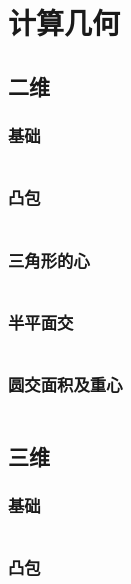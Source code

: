 \chapter{计算几何}

\section{二维}
\subsection{基础}
\inputminted{cpp}{\source/computational-geometry/2d/basis.cpp}
\subsection{凸包}
\inputminted{cpp}{\source/computational-geometry/2d/convex.cpp}
\subsection{三角形的心}
\inputminted{cpp}{\source/computational-geometry/2d/triangle.cpp}
\subsection{半平面交}
\inputminted{cpp}{\source/computational-geometry/2d/half-plane-intersection.cpp}
\subsection{圆交面积及重心}
\inputminted{cpp}{\source/computational-geometry/2d/circles-intersections.cpp}

\section{三维}
\subsection{基础}
\inputminted{cpp}{\source/computational-geometry/3d/basis.cpp}
\subsection{凸包}
\inputminted{cpp}{\source/computational-geometry/3d/convex.cpp}
